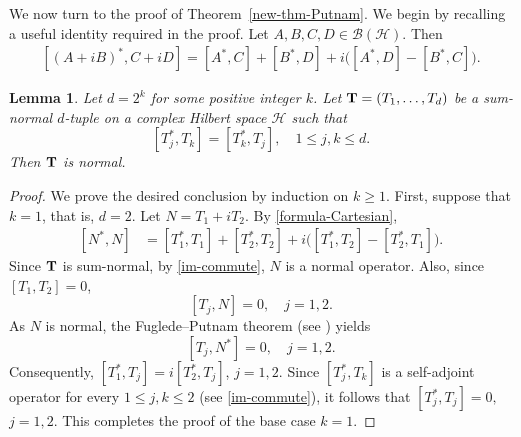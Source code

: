 \documentclass[10pt, a4paper, oneside, reqno]{amsproc}
\numberwithin{equation}{section}
\newtheorem{lemma}[theorem]{Lemma}
\theoremstyle{remark}
\theoremstyle{definition}
\newcommand*{\Ge}{\geqslant}
\newcommand*{\Le}{\leqslant}
\begin{document}
We now turn to the proof of Theorem~\ref{new-thm-Putnam}. We begin by recalling a useful identity required in the proof. Let $A, B, C, D \in \mathcal B(\mathcal H)$. Then 
\begin{align} 
\label{formula-Cartesian}
[(A+iB)^*,C+iD]
=[A^*,C]+[B^*,D]
+i\big([A^*,D]-[B^*,C]\big).
\end{align}
\begin{lemma} \label{coro-Putnam}
Let $d=2^k$ for some positive integer $k$. Let ${\bf T}=(T_1, \ldots, T_{d})$ be a sum-normal $d$-tuple on a complex Hilbert space $\mathcal H$ such that 
\begin{equation} \label{im-commute}
[T^*_j, T_k]=[T^*_k, T_j], \quad 1 \Le j, k \Le d. 
\end{equation}
Then ${\bf T}$ is normal. 
\end{lemma}
\begin{proof} 
We prove the desired conclusion by induction on $k \Ge 1.$ 
First, suppose that $k=1$, that is, $d=2$.
Let $N=T_1+iT_2$. By \eqref{formula-Cartesian},
\begin{align*} 
[N^*,N]
&=[T_1^*,T_1]+[T_2^*,T_2]
+i\big([T_1^*,T_2]-[T_2^*,T_1]\big).
\end{align*}
Since ${\bf T}$ is sum-normal, by \eqref{im-commute}, 
$N$ is a normal operator.
Also, since $[T_1, T_2]=0$, 
$$[T_j,N]=0, \quad j=1,2.$$
As $N$ is normal, the Fuglede--Putnam theorem (see \cite[Corollary~1.18]{RR1973}) yields
$$[T_j,N^*]=0, \quad j=1,2.$$
Consequently,
$[T_1^*,T_j]
=i[T_2^*,T_j]$, $j=1, 2$. Since $[T_j^*,T_k]$ is a self-adjoint operator for every $1 \Le j, k \Le 2$ (see \eqref{im-commute}), it follows that $[T_j^*,T_j]=0,$ $j=1, 2$.
This completes the proof of the base case $k=1$.


\end{proof}
\end{document}
